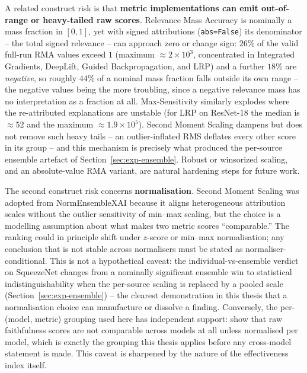 A related construct risk is that \textbf{metric implementations can emit
out-of-range or heavy-tailed raw scores}. Relevance Mass Accuracy is
nominally a mass fraction in $[0, 1]$, yet with signed attributions
(\texttt{abs=False}) its denominator -- the total signed relevance -- can
approach zero or change sign: $26\%$ of the valid full-run RMA values
exceed $1$ (maximum ${\approx}2 \times 10^{3}$, concentrated in Integrated
Gradients, DeepLift, Guided Backpropagation, and LRP) and a further
$18\%$ are \emph{negative}, so roughly $44\%$ of a nominal mass fraction
falls outside its own range -- the negative values being the more troubling,
since a negative relevance mass has no interpretation as a fraction at
all. Max-Sensitivity similarly
explodes where the re-attributed explanations are unstable (for LRP on
ResNet-18 the median is ${\approx}52$ and the maximum ${\approx}1.9 \times
10^{5}$). Second Moment Scaling dampens but does not remove such heavy
tails -- an outlier-inflated RMS deflates every other score in its
group -- and this mechanism is precisely what produced the per-source
ensemble artefact of Section~\ref{sec:exp-ensemble}. Robust or winsorized
scaling, and an absolute-value RMA variant, are natural hardening steps for
future work.

The second construct risk concerns \textbf{normalisation}. Second Moment
Scaling was adopted from NormEnsembleXAI \citep{hryniewska2024normensemblexai}
because it aligns heterogeneous attribution scales without the outlier
sensitivity of min--max scaling, but the choice is a modelling assumption about
what makes two metric scores ``comparable.'' The ranking could in principle
shift under $z$-score or min--max normalisation; any conclusion that is not
stable across normalisers must be stated as normaliser-conditional. This is
not a hypothetical caveat: the individual-vs-ensemble verdict on SqueezeNet
changes from a nominally significant ensemble win to statistical
indistinguishability when the per-source scaling is replaced by a pooled
scale (Section~\ref{sec:exp-ensemble}) -- the clearest demonstration in this
thesis that a normalisation choice can manufacture or dissolve a finding.
Conversely, the per-(model, metric) grouping used here has independent
support: \citet{edin2025naopc} show that raw faithfulness scores are not
comparable across models at all unless normalised per model, which is exactly
the grouping this thesis applies before any cross-model statement is made.
This caveat
is sharpened by the nature of the effectiveness index itself.

